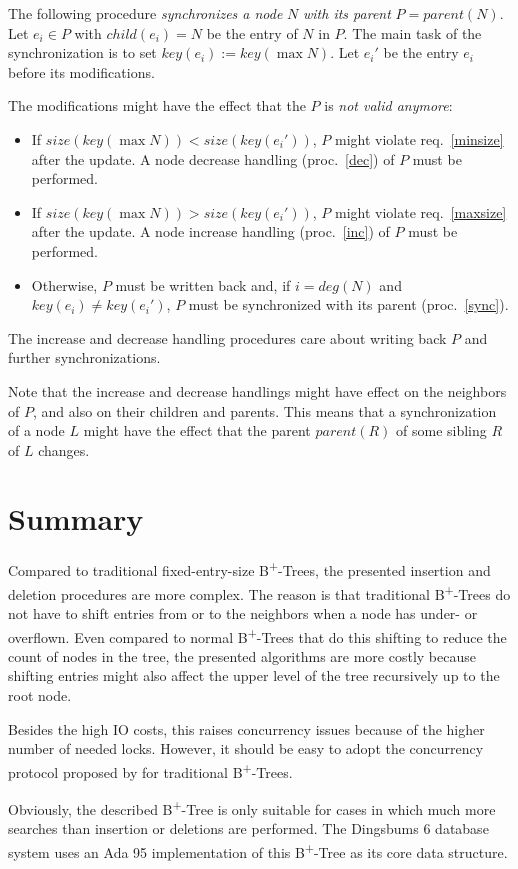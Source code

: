 \documentclass{vldb}
\begin{document}
\begin{proc} \label{sync}
The following procedure {\em synchronizes a node} $N$ {\em with its parent}
$P = parent(N)$.
Let \mbox{$e_i \in P$} with \mbox{$child(e_i) = N$} be the entry of
$N$ in $P$.
The main task of the synchronization is to set \mbox{$key(e_i) := key(\max N)$}.
Let $e_i'$ be the entry $e_i$ before its modifications.

The modifications might have the effect that the $P$ is {\em not valid anymore}:
\begin{itemize}
\item If \mbox{$size(key(\max N)) < size(key(e_i'))$},
    $P$ might violate req.~\ref{minsize} after the update.
    A node decrease handling (proc.~\ref{dec}) of $P$ must be performed.
\item If \mbox{$size(key(\max N)) > size(key(e_i'))$},
    $P$ might violate req.~\ref{maxsize} after the update.
    A node increase handling (proc.~\ref{inc}) of $P$ must be performed.
\item Otherwise, $P$ must be written back and, if $i = deg(N)$ and
    $key(e_i) \neq key(e_i')$, $P$ must be synchronized with its parent
    (proc.~\ref{sync}).
\end{itemize}

The increase and decrease handling procedures care about writing back $P$
and further synchronizations.

Note that the increase and decrease handlings might have effect on the
neighbors of $P$, and also on their children and parents.
This means that a synchronization of a node $L$ might have the effect that
the parent $parent(R)$ of some sibling $R$ of $L$ changes.
\end{proc}



\section{Summary}

Compared to traditional fixed-entry-size B\textsuperscript{+}-Trees, the
presented insertion and deletion procedures are more complex.
The reason is that traditional B\textsuperscript{+}-Trees do not have to shift
entries from or to the neighbors when a node has under- or overflown.
Even compared to normal B\textsuperscript{+}-Trees that do this shifting to
reduce the count of nodes in the tree, the presented algorithms are more
costly because shifting entries might also affect the upper level of the tree
recursively up to the root node.

Besides the high IO costs, this raises concurrency issues because of the higher
number of needed locks.
However, it should be easy to adopt the concurrency protocol proposed by
\cite{Lehman} for traditional B\textsuperscript{+}-Trees.

Obviously, the described B\textsuperscript{+}-Tree is only suitable for cases in
which much more searches than insertion or deletions are performed.
The Dingsbums 6 database system uses an Ada 95 implementation of this
B\textsuperscript{+}-Tree as its core data structure.




\end{document}
